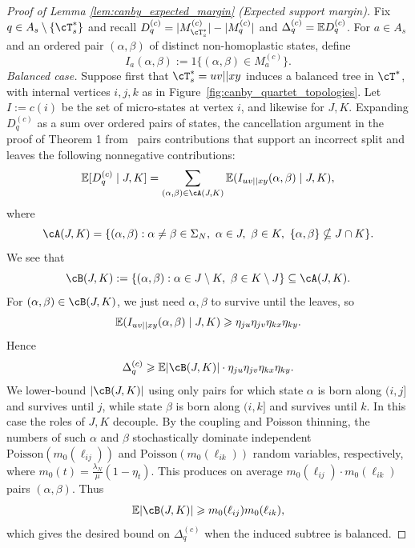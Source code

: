 \begin{proof}[Proof of Lemma \ref{lem:canby_expected_margin} (Expected support margin)]

Fix $q \in A_s \setminus \{\cT_s^*\}$ and recall
$D_q^{(c)}=|M_{\cT_s^*}^{(c)}|-|M_q^{(c)}|$ and $\Delta_q^{(c)}=\mathbb{E} D_q^{(c)}$.
For $a\in A_s$ and an ordered pair $(\alpha, \beta)$ of distinct non-homoplastic states, define
%
\[I_a(\alpha,\beta):=1\{(\alpha,\beta)\in M_a^{(c)}\}.\]
%
\noindent\emph{Balanced case.}
Suppose first that $\cT_s^*=uv||xy$ induces a balanced tree in $\cT^*$, with internal
vertices $i,j,k$ as in Figure~\ref{fig:canby_quartet_topologies}.
Let $I := c(i)$ be the set of micro-states at vertex $i$, and likewise for $J,K$.
Expanding $D_q^{(c)}$ as a sum over ordered pairs of states, the cancellation argument in the proof of
Theorem 1 from~\cite{evans2026_canby_identifiability} pairs contributions that support an
incorrect split and leaves the following nonnegative contributions:
%
\[\E [D_q^{(c)} \mid J, K] = \sum_{(\alpha, \beta) \in \cA(J, K)} \E(I_{uv||xy}(\alpha, \beta) \mid J, K),\]
%
\noindent where
%
\[\cA(J, K) = \{(\alpha, \beta) : \alpha\neq\beta \in \Sigma_N,\ \alpha \in J,\ \beta \in K,\ \{\alpha, \beta\} \nsubseteq J \cap K\}.\]
%
\noindent We see that
%
\[\cB(J, K) := \{(\alpha, \beta) : \alpha \in J \setminus K,\ \beta \in K \setminus J\} \subseteq \cA(J, K).\]
%
\noindent For $(\alpha, \beta) \in \cB(J, K)$, we just need $\alpha, \beta$ to survive until the leaves, so
%
\[\mathbb{E}(I_{uv||xy}(\alpha, \beta) \mid J, K) \geqslant \eta_{ju} \eta_{jv} \eta_{kx} \eta_{ky}.\]
%
\noindent Hence
%
\[\Delta_q^{(c)} \geq \E |\cB(J, K)| \cdot \eta_{ju} \eta_{jv} \eta_{kx} \eta_{ky}.\]
%
\noindent We lower-bound $|\cB(J,K)|$ using only pairs for which state $\alpha$ is born
along $(i,j]$ and survives until $j$, while state $\beta$ is born along $(i,k]$ and
survives until $k$. In this case the roles of $J,K$ decouple. By the coupling and
Poisson thinning, the numbers of such $\alpha$ and $\beta$ stochastically dominate independent
$\mathrm{Poisson}(m_0(\ell_{ij}))$ and $\mathrm{Poisson}(m_0(\ell_{ik}))$ random variables,
respectively, where $m_0(t) = \frac{\lambda_N}{\mu}(1-\eta_t)$. This produces on average
$m_0(\ell_{ij}) \cdot m_0(\ell_{ik})$ pairs $(\alpha, \beta)$.
Thus
%
\[\E|\cB(J,K)|\geq m_0(\ell_{ij})m_0(\ell_{ik}),\]
%
\noindent which gives the desired bound on $\Delta_q^{(c)}$ when the induced subtree is balanced.


\end{proof}

